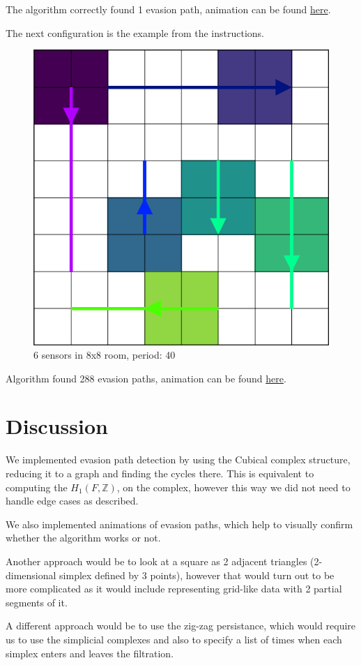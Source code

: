\documentclass{article}
\begin{document}
The algorithm correctly found 1 evasion path, animation can be found \href{https://github.com/MOj0/TDA_Evasion/blob/main/report/ccw.gif}{here}.


\bigskip

The next configuration is the example from the instructions.
\begin{figure}[H]
  \centering
  \includegraphics[width=0.7\linewidth]{example.png}
  \caption{6 sensors in 8x8 room, period: 40}
  \label{fig:example}
\end{figure}

Algorithm found 288 evasion paths, animation can be found \href{https://github.com/MOj0/TDA_Evasion/blob/main/report/example.gif}{here}.


\section{Discussion}

We implemented evasion path detection by using the Cubical complex structure, reducing it to a graph and finding the cycles there.
This is equivalent to computing the $ H_1(F, \mathbb{Z}) $, on the complex, however this way we did not need to handle edge cases as described.

We also implemented animations of evasion paths, which help to visually confirm whether the algorithm works or not.

Another approach would be to look at a square as 2 adjacent triangles (2-dimensional simplex defined by 3 points), however that would turn out to be more complicated as it would include representing grid-like data with 2 partial segments of it.

A different approach would be to use the zig-zag persistance, which would require us to use the simplicial complexes and also to specify a list of times when each simplex enters and leaves the filtration.



\end{document}
